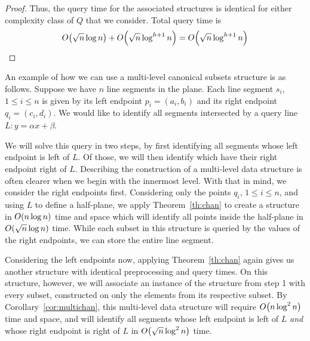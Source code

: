 \begin{proof}
Thus, the query time for the associated structures is identical for either complexity class of $Q$ that we consider. Total query time is
\[
O\!\left(\sqrt{n}\log{n}\right) + O\!\left(\sqrt{n}\log^{h+1}{n}\right) = O\!\left(\sqrt{n}\log^{h+1}{n}\right)
\]

\end{proof}

An example of how we can use a multi-level canonical subsets structure is as follows. 
Suppose we have $n$ line segments in the plane.
Each line segment $s_i$, $1 \leq i \leq n$ is given by its left endpoint $p_i = (a_i, b_i)$ and its right endpoint $q_i = (c_i, d_i)$.
We would like to identify all segments intersected by a query line $L: y = \alpha x + \beta$.

We will solve this query in two steps, by first identifying all segments whose left endpoint is left of $L$. 
Of those, we will then identify which have their right endpoint right of $L$.
Describing the construction of a multi-level data structure is often clearer when we begin with the innermost level.
With that in mind, we consider the right endpoints first. 
Considering only the points $q_i$, $1 \leq i \leq n$, and using $L$ to define a half-plane, we apply 
Theorem~\ref{th:chan} to create a structure in $O\!\left(n\log{n}\right)$ time and space which will identify all points inside the half-plane in $O\!\left(\sqrt{n}\log{n}\right)$ time.  
While each subset in this structure is queried by the values of the right endpoints, we can store the entire line segment.

Considering the left endpoints now, applying Theorem~\ref{th:chan} again gives us another structure with identical preprocessing and query times. 
On this structure, however, we will associate an instance of the structure from step 1 with every subset, constructed on only the elements from its respective subset. 
By Corollary~\ref{cor:multichan}, this multi-level data structure will require $O\!\left(n\log^2{n}\right)$ time and space, and will identify all segments whose left endpoint is left of $L$ \emph{and} whose right endpoint is right of $L$ in $O\!\left(\sqrt{n}\log^2{n}\right)$ time.
